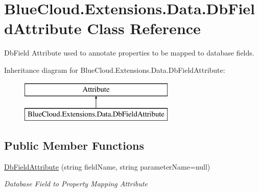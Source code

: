 \hypertarget{class_blue_cloud_1_1_extensions_1_1_data_1_1_db_field_attribute}{}\section{Blue\+Cloud.\+Extensions.\+Data.\+Db\+Field\+Attribute Class Reference}
\label{class_blue_cloud_1_1_extensions_1_1_data_1_1_db_field_attribute}


Db\+Field Attribute used to annotate properties to be mapped to database fields.  


Inheritance diagram for Blue\+Cloud.\+Extensions.\+Data.\+Db\+Field\+Attribute\+:\begin{figure}[H]
\begin{center}
\leavevmode
\includegraphics[height=2.000000cm]{class_blue_cloud_1_1_extensions_1_1_data_1_1_db_field_attribute}
\end{center}
\end{figure}
\subsection*{Public Member Functions}
\begin{DoxyCompactItemize}
\item 
\mbox{\hyperlink{class_blue_cloud_1_1_extensions_1_1_data_1_1_db_field_attribute_a215a03bd00877393b57b061cbf6fdc85}{Db\+Field\+Attribute}} (string field\+Name, string parameter\+Name=null)
\begin{DoxyCompactList}\small\item\em Database Field to Property Mapping Attribute \end{DoxyCompactList}\end{DoxyCompactItemize}
